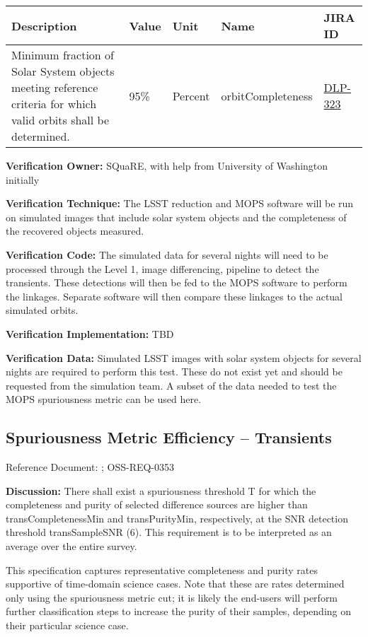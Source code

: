 \documentclass[DM,lsstdraft,toc]{lsstdoc}
\newcommand{\jira}[1]{\href{https://jira.lsstcorp.org/browse/#1}{#1}}
\begin{document}
\begin{longtable}[]{@{}p{}llll@{}}
\toprule
Description & Value & Unit & Name & JIRA ID\tabularnewline
\midrule
\endhead
Minimum fraction of Solar System objects meeting reference criteria for
which valid orbits shall be determined. & 95\% & Percent &
orbitCompleteness & \jira{DLP-323}\tabularnewline
\bottomrule
\end{longtable}

\textbf{Verification Owner:} SQuaRE, with help from University of
Washington initially

\textbf{Verification Technique:} The LSST reduction and MOPS software
will be run on simulated images that include solar system objects and
the completeness of the recovered objects measured.

\textbf{Verification Code:} The simulated data for several nights will
need to be processed through the Level 1, image differencing, pipeline
to detect the transients. These detections will then be fed to the MOPS
software to perform the linkages. Separate software will then compare
these linkages to the actual simulated orbits.

\textbf{Verification Implementation:} TBD

\textbf{Verification Data:} Simulated LSST images with solar system
objects for several nights are required to perform this test. These do
not exist yet and should be requested from the simulation team. A subset
of the data needed to test the MOPS spuriousness metric can be used
here.

\subsection{Spuriousness Metric Efficiency --
Transients}\label{spuriousness-metric-efficiency-transients}

Reference Document: ; OSS-REQ-0353

\textbf{Discussion:} There shall exist a spuriousness threshold T for
which the completeness and purity of selected difference sources are
higher than transCompletenessMin and transPurityMin, respectively, at
the SNR detection threshold transSampleSNR (6). This requirement is to
be interpreted as an average over the entire survey.

This specification captures representative completeness and purity rates
supportive of time-domain science cases. Note that these are rates
determined only using the spuriousness metric cut; it is likely the
end-users will perform further classification steps to increase the
purity of their samples, depending on their particular science case.
\end{document}
